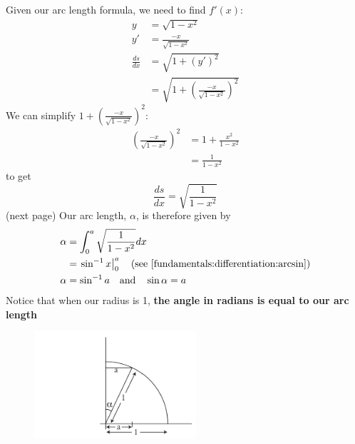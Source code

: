 \documentclass{report}
\begin{document}
Given our arc length formula, we need to find $f'(x)$:
\begin{align*}
y&=\sqrt{1-x^2}\\
y'&=\frac{-x}{\sqrt{1-x^2}}\\
\frac{ds}{dx}&=\sqrt{1+(y')^2}\\
&=\sqrt{1+\left(\frac{-x}{\sqrt{1-x^2}}\right)^2}
\end{align*}
We can simplify $1+\left(\frac{-x}{\sqrt{1-x^2}}\right)^2$:
\begin{align*}
\left(\frac{-x}{\sqrt{1-x^2}}\right)^2
&=1+\frac{x^2}{1-x^2}\\
&=\frac{1}{1-x^2}
\end{align*}
to get
\begin{equation*}
\frac{ds}{dx}=\sqrt{\frac{1}{1-x^2}}
\end{equation*}
(next page)
\newpage
\noindent Our arc length, $\alpha$, is therefore given by
\begin{align*}
\alpha&=\int_0^a\sqrt{\frac{1}{1-x^2}}dx\\
&=\left.\sin^{-1}x\right|_0^a\quad\text{(see \ref{fundamentals:differentiation:arcsin})}\\
\alpha&=\sin^{-1}a\quad\text{and}\quad\sin\alpha=a
\end{align*}
Notice that when our radius is 1, \textbf{the angle in radians is equal to our arc length}
\begin{figure}[h]
\includegraphics[width=6cm]{Capture47}\\
\centering
{}
\end{figure}\\
\vspace{1mm}
\newpage
\end{document}
